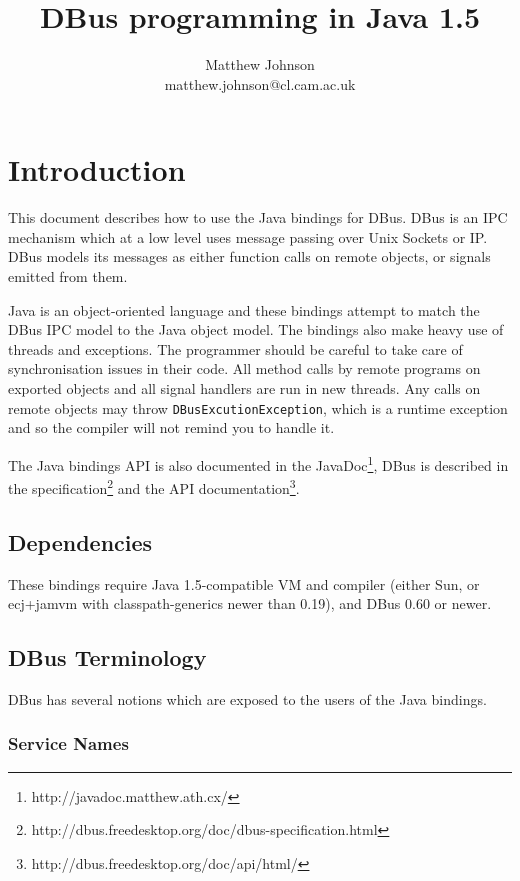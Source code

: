 \documentclass[a4paper,12pt]{article}
\author{Matthew Johnson\\matthew.johnson@cl.cam.ac.uk}
\title{DBus programming in Java 1.5}
\begin{document}
\maketitle

\tableofcontents
\listoffigures
\listoftables

\section{Introduction}

This document describes how to use the Java bindings for DBus. DBus
is an IPC mechanism which at a low level uses message passing over
Unix Sockets or IP. DBus models its messages as either function
calls on remote objects, or signals emitted from them.

Java is an object-oriented language and these bindings attempt to
match the DBus IPC model to the Java object model. The bindings also
make heavy use of threads and exceptions. The programmer should be
careful to take care of synchronisation issues in their code. All
method calls by remote programs on exported objects and all signal
handlers are run in new threads. Any calls on remote objects may
throw {\tt DBusExcutionException}, which is a runtime exception and
so the compiler will not remind you to handle it.

The Java bindings API is also documented in the
JavaDoc\footnote{http://javadoc.matthew.ath.cx/}, DBus is
described in the
specification\footnote{http://dbus.freedesktop.org/doc/dbus-specification.html}
and the API
documentation\footnote{http://dbus.freedesktop.org/doc/api/html/}.

\subsection{Dependencies}

These bindings require Java 1.5-compatible VM and compiler (either
Sun, or ecj+jamvm with classpath-generics newer than 0.19), and DBus
0.60 or newer.

\subsection{DBus Terminology}

DBus has several notions which are exposed to the users of the Java
bindings.

\subsubsection{Service Names}
\end{document}
